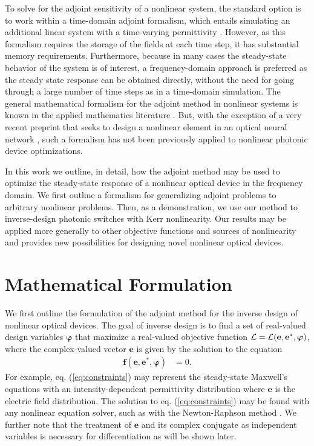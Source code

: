 To solve for the adjoint sensitivity of a nonlinear system, the standard option is to work within a time-domain adjoint formalism, which entails simulating an additional linear system with a time-varying permittivity \cite{elesin_design_2012}.  However, as this formalism requires the storage of the fields at each time step, it has substantial memory requirements.  Furthermore, because in many cases the steady-state behavior of the system is of interest, a frequency-domain approach is preferred as the steady state response can be obtained directly, without the need for going through a large number of time steps as in a time-domain simulation.  The general mathematical formalism for the adjoint method in nonlinear systems is known in the applied mathematics literature \cite{Strang2007}. But, with the exception of a very recent preprint that seeks to design a nonlinear element in an optical neural network  \cite{khoram2018stochastic}, such a formalism has not been previously applied to nonlinear photonic device optimizations.

In this work we outline, in detail, how the adjoint method may be used to optimize the steady-state response of a nonlinear optical device in the frequency domain. We first outline a formalism for generalizing adjoint problems to arbitrary nonlinear problems.  Then, as a demonstration, we use our method to inverse-design photonic switches with Kerr nonlinearity.  Our results may be applied more generally to other objective functions and sources of nonlinearity and provides new possibilities for designing novel nonlinear optical devices.

\section{Mathematical Formulation}

We first outline the formulation of the adjoint method for the inverse design of nonlinear optical devices.  The goal of inverse design is to find a set of real-valued design variables $\bm{\varphi}$ that maximize a real-valued objective function $\mathbf{\mathcal{L}} = \mathbf{\mathcal{L}}(\mathbf{e}, \mathbf{e}^*, \bm{\varphi})$, where the complex-valued vector $\mathbf{e}$ is given by the solution to the equation
%
\begin{align}
\mathbf{f}(\mathbf{e}, \mathbf{e}^*, \bm{\varphi}) &= 0
\label{eq:constraints}.
\end{align}
%
For example, eq. (\ref{eq:constraints}) may represent the steady-state Maxwell's equations with an intensity-dependent permittivity distribution where $\mathbf{e}$ is the electric field distribution.  The solution to eq. (\ref{eq:constraints}) may be found with any nonlinear equation solver, such as with the Newton-Raphson method \cite{press2007numerical}.  We further note that the treatment of $\mathbf{e}$ and its complex conjugate as independent variables is necessary for differentiation as will be shown later.

